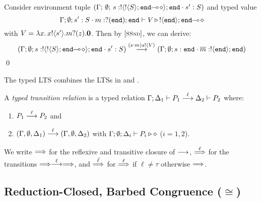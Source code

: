 
\begin{example}
	Consider environment tuple
	$
		(\Gamma;\, \emptyset;\, s: ! \langle ! \langle S \rangle ; \mathtt{end}\!\! \multimap\! \diamond \rangle ; \mathtt{end} \cdot s': S)
	$
	and typed value
	\[
		\Gamma; \emptyset; s': S \cdot m: ? (\mathtt{end}) ; \mathtt{end} \vdash V \, \triangleright \, ! \langle \mathtt{end} \rangle ; \mathtt{end}\!\! \multimap\! \diamond
	\]
	\noi with
	$
		V= \lambda x.\,x ! \langle s' \rangle . m ? (z) . \mathbf{0}
	$.
%
	Then by ${[\text{\footnotesize \textsc{SSnd}}]}$, we can derive:
%
	\[
		(\Gamma; \emptyset; s: ! \langle ! \langle S \rangle ; \mathtt{end}\!\! \multimap\! \diamond \rangle ; \mathtt{end} \cdot s': S) \stackrel{(\nu\, m) s ! \langle V \rangle}{\longrightarrow} (\Gamma; \emptyset; s: \mathtt{end} \cdot \overline{m}: ! \langle \mathtt{end} \rangle ; \mathtt{end})
	\]
	\qed
\end{example}

\noi
The typed LTS  combines
the LTSs in 
and . 

\begin{definition}
	\label{d:tlts}
	A {\em typed transition relation} is a typed relation
	$\Gamma; \Delta_1 \vdash P_1 \stackrel{\ell}{\longrightarrow} \Delta_2 \vdash P_2$
	where:
%
	\begin{enumerate}
		\item
				$P_1 \stackrel{\ell}{\longrightarrow} P_2$ and 
		\item
				$(\Gamma, \emptyset, \Delta_1) \stackrel{\ell}{\longrightarrow} (\Gamma, \emptyset, \Delta_2)$ 
				with $\Gamma; \emptyset; \Delta_i \vdash P_i \triangleright \diamond$ ($i=1,2$).
	\end{enumerate}
%
	We 
	write  $\stackrel{}{\Longrightarrow}$ for the reflexive and transitive closure of $\stackrel{}{\longrightarrow}$,
	$\stackrel{\ell}{\Longrightarrow}$ for the transitions $\stackrel{}{\Longrightarrow}\stackrel{\ell}{\longrightarrow}\stackrel{}{\Longrightarrow}$, and $\stackrel{\hat{\ell}}{\Longrightarrow}$
	for $\stackrel{\ell}{\Longrightarrow}$ if $\ell\not = \tau$ otherwise $\stackrel{}{\Longrightarrow}$. 
\end{definition}


\subsection{Reduction-Closed, Barbed Congruence ($\cong$)}
\label{subsec:rc}


